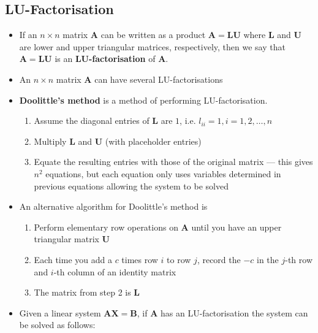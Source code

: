 \documentclass{article}
\begin{document}
\subsection{LU-Factorisation}

\begin{itemize}
  \item If an $n \times n$ matrix $\mathbf{A}$ can be written as a product $\mathbf{A = L U}$ where $\mathbf{L}$ and $\mathbf{U}$ are lower and upper triangular matrices, respectively, then we say that $\mathbf{A = L U}$ is an \textbf{LU-factorisation} of $\mathbf{A}$.

  \item An $n \times n$ matrix $\mathbf{A}$ can have several LU-factorisations

  \item \textbf{Doolittle's method} is a method of performing LU-factorisation.

        \begin{enumerate}
          \item Assume the diagonal entries of $\mathbf{L}$ are $1$, i.e. $l_{ii} = 1, i = 1, 2, \ldots, n$

          \item Multiply $\mathbf{L}$ and $\mathbf{U}$ (with placeholder entries)

          \item Equate the resulting entries with those of the original matrix — this gives $n^2$ equations, but each equation only uses variables determined in previous equations allowing the system to be solved
        \end{enumerate}

  \item An alternative algorithm for Doolittle's method is

        \begin{enumerate}
          \item Perform elementary row operations on $\mathbf{A}$ until you have an upper triangular matrix $\mathbf{U}$

          \item Each time you add a $c$ times row $i$ to row $j$, record the $-c$ in the $j$-th row and $i$-th column of an identity matrix

          \item The matrix from step 2 is $\mathbf{L}$
        \end{enumerate}

  \item Given a linear system $\mathbf{A X = B}$, if $\mathbf{A}$ has an LU-factorisation the system can be solved as follows:


\end{itemize}
\end{document}
